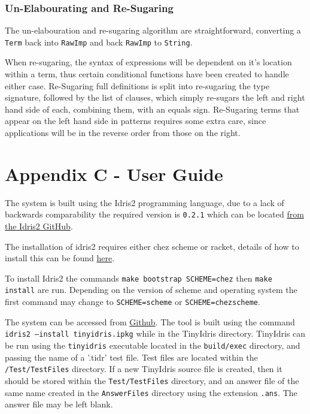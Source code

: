 \documentclass[a4paper]{article}
\begin{document}
\subsubsection{Un-Elabourating and Re-Sugaring}

The un-elabouration and re-sugaring algorithm are straightforward,
converting a \texttt{Term} back into \texttt{RawImp} and back \texttt{RawImp} to \texttt{String}.

When re-sugaring, the syntax of expressions will be dependent on it's location within a term,
thus certain conditional functions have been created to handle either case.
Re-Sugaring full definitions is split into re-sugaring the type
signature, followed by the list of clauses, which simply re-sugars the
left and right hand side of each, combining them, with an equals sign.
Re-Sugaring terms that appear on the left hand side in patterns
requires some extra care, since applications will be in the reverse
order from those on the right. 

\clearpage
\section{Appendix C - User Guide}

The system is built using the Idris2 programming language, due to
a lack of backwards comparability the required version is
\texttt{0.2.1} which can be located
\href{https://github.com/idris-lang/Idris2/tree/compat-0.2.1}{from the Idris2 GitHub}.

The installation of idris2 requires either chez scheme or racket,
details of how to install this can be found
\href{https://www.scheme.com/}{here}.

To install Idris2 the commands \texttt{make bootstrap SCHEME=chez}
then \texttt{make install} are run. Depending on the version of
scheme and operating system the first command may change to
\texttt{SCHEME=scheme} or \texttt{SCHEME=chezscheme}. 


The system can be accessed from \href{https://github.com/Ablach/tiny-idris-program-synthesis}{Github}. The tool is built using the command
\texttt{idris2 --install tinyidris.ipkg} while in the TinyIdris
directory. TinyIdris can be run using the \texttt{tinyidris}
executable located in the \texttt{build/exec} directory, and passing
the name of a '.tidr' test file. Test files are located within the \texttt{/Test/TestFiles} directory. If a new TinyIdris source file is created, then it
should be stored within the \texttt{Test/TestFiles}
directory, and an answer file of the same name created in the
\texttt{AnswerFiles} directory using the extension \texttt{.ans}.
The answer file may be left blank. 
\end{document}
